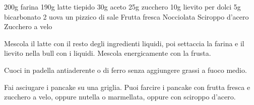 \begin{ingreds}
	200g farina
	190g latte tiepido
	30g aceto
	25g zucchero
	10g lievito per dolci
	5g bicarbonato
	2 uova
	un pizzico di sale
\columnbreak
	Frutta fresca
	Nocciolata
	Sciroppo d'acero
	Zucchero a velo
\end{ingreds}

\begin{method}
Mescola il latte con il resto degli ingredienti liquidi, poi settaccia la farina e il lievito nella bull con i liquidi. Mescola energicamente con la frusta.

Cuoci in padella antiaderente o di ferro senza aggiungere grassi a fuoco medio.

Fai asciugare i pancake su una griglia. Puoi farcire i pancake con frutta fresca e zucchero a velo, oppure nutella o marmellata, oppure con sciroppo d'acero.
\end {method}



